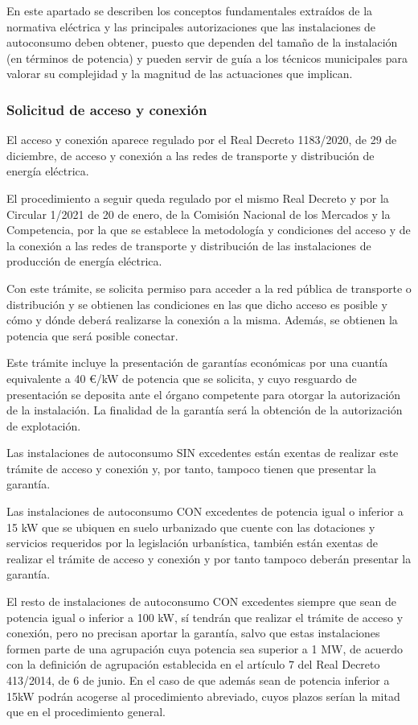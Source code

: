 \documentclass{article}
\begin{document}
En este apartado se describen los conceptos fundamentales extraídos de la normativa eléctrica y las principales autorizaciones que las instalaciones de autoconsumo deben obtener, puesto que dependen del tamaño de la instalación (en términos de potencia) y pueden servir de guía a los técnicos municipales para valorar su complejidad y la magnitud de las actuaciones que implican.

\subsubsection{Solicitud de acceso y conexión}

El acceso y conexión aparece regulado por el Real Decreto 1183/2020, de 29 de diciembre, de acceso y conexión a las redes de transporte y distribución de energía eléctrica.

El procedimiento a seguir queda regulado por el mismo Real Decreto y por la Circular 1/2021 de 20 de enero, de la Comisión Nacional de los Mercados y la Competencia, por la que se establece la metodología y condiciones del acceso y de la conexión a las redes de transporte y distribución de las instalaciones de producción de energía eléctrica.

Con este trámite, se solicita permiso para acceder a la red pública de transporte o distribución y se obtienen las condiciones en las que dicho acceso es posible y cómo y dónde deberá realizarse la conexión a la misma. Además, se obtienen la potencia que será posible conectar.

Este trámite incluye la presentación de garantías económicas por una cuantía equivalente a 40 €/kW de potencia que se solicita, y cuyo resguardo de presentación se deposita ante el órgano competente para otorgar la autorización de la instalación. La finalidad de la garantía será la obtención de la autorización de explotación.

Las instalaciones de autoconsumo SIN excedentes están exentas de realizar este trámite de acceso y conexión y, por tanto, tampoco tienen que presentar la garantía.

Las instalaciones de autoconsumo CON excedentes de potencia igual o inferior a 15 kW que se ubiquen en suelo urbanizado que cuente con las dotaciones y servicios requeridos por la legislación urbanística, también están exentas de realizar el trámite de acceso y conexión y por tanto tampoco deberán presentar la garantía.

El resto de instalaciones de autoconsumo CON excedentes siempre que sean de potencia igual o inferior a 100 kW, sí tendrán que realizar el trámite de acceso y conexión, pero no precisan aportar la garantía, salvo que estas instalaciones formen parte de una agrupación cuya potencia sea superior a 1 MW, de acuerdo con la definición de agrupación establecida en el artículo 7 del Real Decreto 413/2014, de 6 de junio. En el caso de que además sean de potencia inferior a 15kW podrán acogerse al procedimiento abreviado, cuyos plazos serían la mitad que en el procedimiento general.
\end{document}
